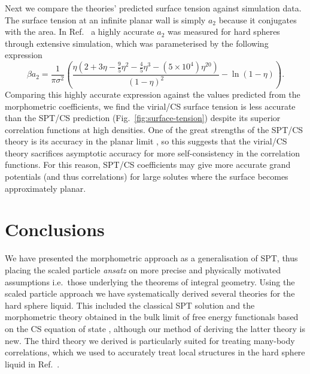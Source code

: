 \documentclass[11pt,twoside]{report}
\begin{document}
Next we compare the theories' predicted surface tension against simulation data.
The surface tension at an infinite planar wall is simply $a_2$ because it conjugates with the area.
In Ref.\ \cite{DavidchackMP2015} a highly accurate $a_2$ was measured for hard spheres through extensive simulation, which was parameterised by the following expression
\begin{equation}\label{eq:quasi-exact-surface-tension}
  \beta a_2
  =
  \frac{1}{\pi \sigma^2} \left(
  \frac{\eta (2 + 3\eta - \frac{9}{5}\eta^2 - \frac{4}{5}\eta^3 - (5 \times 10^4) \eta^{20})}{(1 - \eta)^2}
  - \ln{(1 - \eta)}
  \right).
\end{equation}
Comparing this highly accurate expression against the values predicted from the morphometric coefficients, we find the virial/CS surface tension is less accurate than the SPT/CS prediction (Fig.\ \ref{fig:surface-tension}) despite its superior correlation functions at high densities.
One of the great strengths of the SPT/CS theory is its accuracy in the planar limit \cite{Hansen-GoosJPCM2006}, so this suggests that the virial/CS theory sacrifices asymptotic accuracy for more self-consistency in the correlation functions.
For this reason, SPT/CS coefficients may give more accurate grand potentials (and thus correlations) for large solutes where the surface becomes approximately planar.

\section{Conclusions}

We have presented the morphometric approach as a generalisation of SPT, thus placing the scaled particle \emph{ansatz} on more precise and physically motivated assumptions i.e.\ those underlying the theorems of integral geometry.
Using the scaled particle approach we have systematically derived several theories for the hard sphere liquid.
This included the classical SPT solution and the morphometric theory obtained in the bulk limit of free energy functionals based on the CS equation of state%
,
although our method of deriving the latter theory is new.
The third theory we derived is particularly suited for treating many-body correlations, which we used to accurately treat local structures in the hard sphere liquid in Ref.\ \cite{RobinsonPRL2019}.
\end{document}
